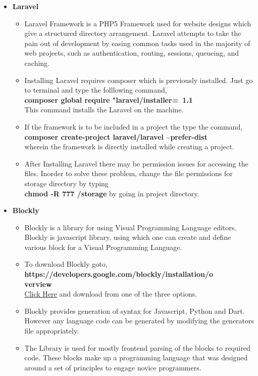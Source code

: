 \documentclass[a4paper,12pt,oneside]{book}
\begin{document}
\begin{itemize}
\begin{itemize}
\begin{itemize}
      \end{itemize}
      \newpage
      \item \textbf{Laravel}
      \begin{itemize}
	\item
	Laravel Framework is a PHP5 Framework used for website designs which give a structured directory arrangement. 
	Laravel attempts to take the pain out of development by easing common tasks used in the majority of web projects,
	such as authentication, routing, sessions, queueing, and caching.
	\item 
	Installing Laravel requires composer which is previously installed. Just go to terminal and type the folllowing command,\\
	\textbf{composer global require "laravel/installer=~1.1}\\
	This command installs the Laravel on the machine.
	\item
	If the framework is to be included in a project the type the command,\\
	\textbf{composer create-project laravel/laravel --prefer-dist}\\ wherein the framework is directly installed while creating a project.
	\item 
	After Installing Laravel there may be permission issues for accessing the files. Inorder to solve these problem, change the file permissions for
	storage directory by typing \\\textbf{chmod -R 777 /storage} by going in project directory.\\
      \end{itemize}
      \newpage
      \item \textbf{Blockly}
      \begin{itemize}
	\item
	Blockly is a library for using Visual Programming Language editors. Blockly is javascript library, using which one can
	create and define various block for a Visual Programming Language.
	\item
	To download Blockly goto,\\ \textbf{https://developers.google.com/blockly/installation/o\\verview}\\
	\href{https://developers.google.com/blockly/installation/overview}{Click Here}
	and download from one of the three options.
	\item 
	Blockly provides generation of syntax for Javascript, Python and Dart. However any language code can be generated by 
	modifying the generators file appropriately.
	\item 
	The Library is used for mostly frontend parsing of the blocks to required code. These blocks make up a programming language that was designed around a set of principles to engage novice programmers.\\
      \end{itemize}
  \end{itemize}
  \newpage

\end{itemize}
\end{document}
